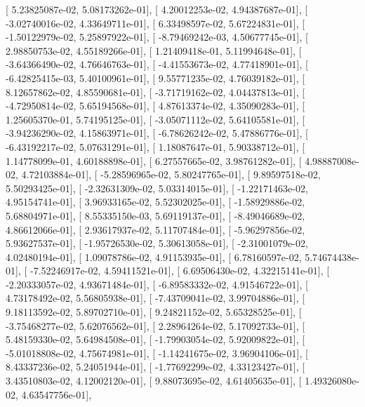 \documentclass{article}
\begin{document}
       [  5.23825087e-02,   5.08173262e-01],
       [  4.20012253e-02,   4.94387687e-01],
       [ -3.02740016e-02,   4.33649711e-01],
       [  6.33498597e-02,   5.67224831e-01],
       [ -1.50122979e-02,   5.25897922e-01],
       [ -8.79469242e-03,   4.50677745e-01],
       [  2.98850753e-02,   4.55189266e-01],
       [  1.21409418e-01,   5.11994648e-01],
       [ -3.64366490e-02,   4.76646763e-01],
       [ -4.41553673e-02,   4.77418901e-01],
       [ -6.42825415e-03,   5.40100961e-01],
       [  9.55771235e-02,   4.76039182e-01],
       [  8.12657862e-02,   4.85590681e-01],
       [ -3.71719162e-02,   4.04437813e-01],
       [ -4.72950814e-02,   5.65194568e-01],
       [  4.87613374e-02,   4.35090283e-01],
       [  1.25605370e-01,   5.74195125e-01],
       [ -3.05071112e-02,   5.64105581e-01],
       [ -3.94236290e-02,   4.15863971e-01],
       [ -6.78626242e-02,   5.47886776e-01],
       [ -6.43192217e-02,   5.07631291e-01],
       [  1.18087647e-01,   5.90338712e-01],
       [  1.14778099e-01,   4.60188898e-01],
       [  6.27557665e-02,   3.98761282e-01],
       [  4.98887008e-02,   4.72103884e-01],
       [ -5.28596965e-02,   5.80247765e-01],
       [  9.89597518e-02,   5.50293425e-01],
       [ -2.32631309e-02,   5.03314015e-01],
       [ -1.22171463e-02,   4.95154741e-01],
       [  3.96933165e-02,   5.52302025e-01],
       [ -1.58929886e-02,   5.68804971e-01],
       [  8.55335150e-03,   5.69119137e-01],
       [ -8.49046689e-02,   4.86612066e-01],
       [  2.93617937e-02,   5.11707484e-01],
       [ -5.96297856e-02,   5.93627537e-01],
       [ -1.95726530e-02,   5.30613058e-01],
       [ -2.31001079e-02,   4.02480194e-01],
       [  1.09078786e-02,   4.91153935e-01],
       [  6.78160597e-02,   5.74674438e-01],
       [ -7.52246917e-02,   4.59411521e-01],
       [  6.69506430e-02,   4.32215141e-01],
       [ -2.20333057e-02,   4.93671484e-01],
       [ -6.89583332e-02,   4.91546722e-01],
       [  4.73178492e-02,   5.56805938e-01],
       [ -7.43709041e-02,   3.99704886e-01],
       [  9.18113592e-02,   5.89702710e-01],
       [  9.24821152e-02,   5.65328525e-01],
       [ -3.75468277e-02,   5.62076562e-01],
       [  2.28964264e-02,   5.17092733e-01],
       [  5.48159330e-02,   5.64984508e-01],
       [ -1.79903054e-02,   5.92009822e-01],
       [ -5.01018808e-02,   4.75674981e-01],
       [ -1.14241675e-02,   3.96904106e-01],
       [  8.43337236e-02,   5.24051944e-01],
       [ -1.77692299e-02,   4.33123427e-01],
       [  3.43510803e-02,   4.12002120e-01],
       [  9.88073695e-02,   4.61405635e-01],
       [  1.49326080e-02,   4.63547756e-01],
\end{document}
